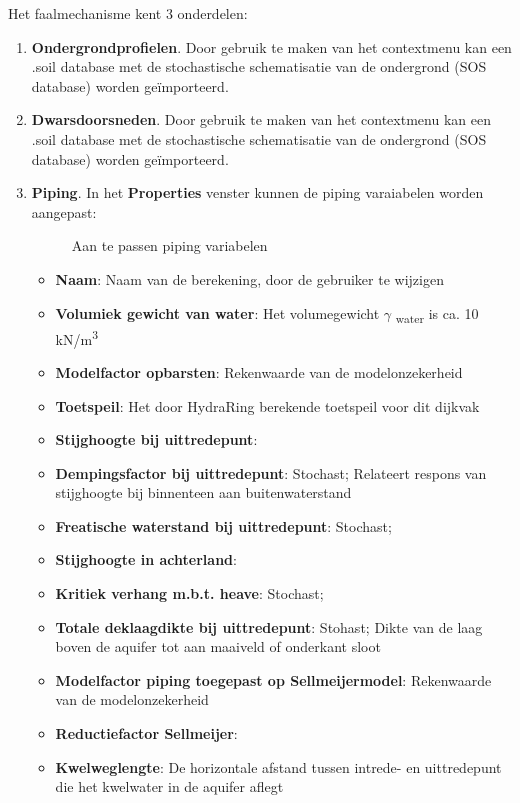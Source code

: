 Het faalmechanisme kent 3 onderdelen:
\begin{enumerate}
\item \textbf{Ondergrondprofielen}. Door gebruik te maken van het contextmenu kan een .soil database met de stochastische schematisatie van de
ondergrond (SOS database) worden ge\"{i}mporteerd.
\item \textbf{Dwarsdoorsneden}. Door gebruik te maken van het contextmenu kan een .soil database met de stochastische schematisatie van de
ondergrond (SOS database) worden ge\"{i}mporteerd.
\item \textbf{Piping}. In het \textbf{Properties} venster kunnen de piping varaiabelen worden aangepast:
\begin{figure} [H]
	\centering
	\caption{Aan te passen piping variabelen}
	\label{fig:fig5.5}
\end{figure}
	\begin{itemize}
	\item \textbf{Naam}: Naam van de berekening, door de gebruiker te wijzigen
	\item \textbf{Volumiek gewicht van water}: Het volumegewicht  $\gamma$ \textsubscript{water}  is ca. 10 kN/m\textsuperscript{3}
	\item \textbf{Modelfactor opbarsten}: Rekenwaarde van de modelonzekerheid
	\item \textbf{Toetspeil}: Het door HydraRing berekende toetspeil voor dit dijkvak
	\item \textbf{Stijghoogte bij uittredepunt}: 
	\item \textbf{Dempingsfactor bij uittredepunt}: Stochast; Relateert respons van stijghoogte bij binnenteen aan buitenwaterstand
	\item \textbf{Freatische waterstand bij uittredepunt}: Stochast; 
	\item \textbf{Stijghoogte in achterland}: 
	\item \textbf{Kritiek verhang m.b.t. heave}: Stochast; 
	\item \textbf{Totale deklaagdikte bij uittredepunt}: Stohast; Dikte van de laag boven de aquifer tot aan maaiveld of onderkant sloot
	\item \textbf{Modelfactor piping toegepast op Sellmeijermodel}: Rekenwaarde van de modelonzekerheid
	\item \textbf{Reductiefactor Sellmeijer}: 
	\item \textbf{Kwelweglengte}: De horizontale afstand tussen intrede- en uittredepunt die het kwelwater in de aquifer aflegt

\end{itemize}
\end{enumerate}
